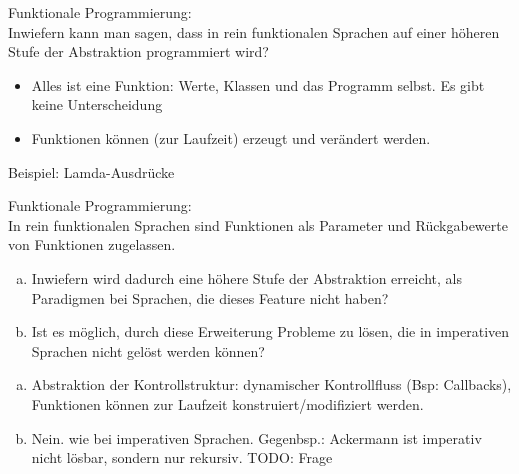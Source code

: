 \begin{card}
	Funktionale Programmierung:\\
	Inwiefern kann man sagen, dass in rein funktionalen Sprachen auf einer höheren Stufe der Abstraktion programmiert wird?
	\hr
	\begin{itemize}
	\item Alles ist eine Funktion: Werte, Klassen und das Programm selbst. Es gibt keine Unterscheidung
	\item Funktionen können (zur Laufzeit) erzeugt und verändert werden.
	
	\end{itemize}
	Beispiel: Lamda-Ausdrücke
\end{card}

\begin{card}
	Funktionale Programmierung:\\
	In rein funktionalen Sprachen sind Funktionen als Parameter und Rückgabewerte von Funktionen zugelassen. 
	\begin{enumerate}[a)]
	\item  Inwiefern wird dadurch eine höhere Stufe der Abstraktion erreicht, als Paradigmen bei Sprachen, die dieses Feature nicht haben?
	\item Ist es möglich, durch diese Erweiterung Probleme zu lösen, die in imperativen Sprachen nicht gelöst werden können?
	\end{enumerate}
	\hr
	\begin{enumerate}[a)]
	\item Abstraktion der Kontrollstruktur: dynamischer Kontrollfluss (Bsp: Callbacks), Funktionen können zur Laufzeit konstruiert/modifiziert werden.
	\item  Nein. wie bei imperativen Sprachen. Gegenbsp.: Ackermann ist imperativ nicht lösbar, sondern nur rekursiv. TODO: Frage
	\end{enumerate}
\end{card}
